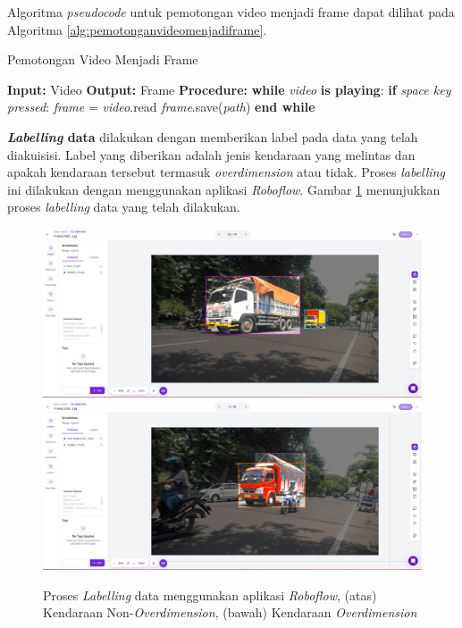 Algoritma \emph{pseudocode} untuk pemotongan video menjadi frame dapat dilihat pada Algoritma \ref{alg:pemotonganvideomenjadiframe}.

\begin{algorithm}
  \caption{Pemotongan Video Menjadi Frame}
  \label{alg:pemotonganvideomenjadiframe}
  \begin{algorithmic}[1]
    \State \textbf{Input:} Video
    \State \textbf{Output:} Frame
    \State \textbf{Procedure:}
    \State \hspace{0.5cm} \textbf{while} \textit{video} \textbf{is playing}:
    \State \hspace{1cm} \textbf{if} \textit{space key pressed}:
    \State \hspace{1.5cm} \textit{frame} = \textit{video}.read
    \State \hspace{1.5cm} \textit{frame}.save(\textit{path})
    \State \hspace{0.5cm} \textbf{end while}
  \end{algorithmic}
\end{algorithm}

\textbf{\emph{Labelling} data} dilakukan dengan memberikan label pada data yang telah diakuisisi. Label yang diberikan adalah jenis kendaraan yang melintas dan apakah kendaraan tersebut termasuk \emph{overdimension} atau tidak. Proses \emph{labelling} ini dilakukan dengan menggunakan aplikasi \emph{Roboflow}. Gambar \ref{fig:labellingdata} menunjukkan proses \emph{labelling} data yang telah dilakukan.

\begin{figure}[h]
  \centering

  \includegraphics[scale=0.25]{gambar/bab3-labelling-data-nonoverdimension.jpeg}
  \includegraphics[scale=0.25]{gambar/bab3-labelling-data-overdimension.jpeg}

  \caption{\centering Proses \emph{Labelling} data menggunakan aplikasi \emph{Roboflow}, (atas) Kendaraan Non-\emph{Overdimension}, (bawah) Kendaraan \emph{Overdimension}}
  \label{fig:labellingdata}
\end{figure}

